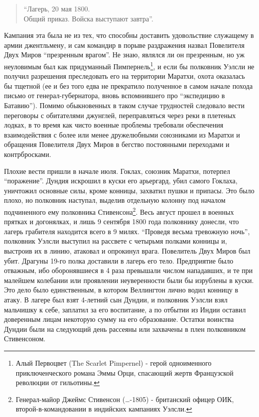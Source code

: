 \documentclass[
  oneside,
  12pt,
  titlepage]{book}
\begin{document}
\begin{quote}
``Лагерь, 20 мая 1800.\\
Общий приказ. Войска выступают завтра''.
\end{quote}

Кампания эта была не из тех, что способны доставить удовольствие служащему в армии джентльмену, и сам командир в порыве раздражения назвал Повелителя Двух Миров ``презренным врагом''. Не знаю, являлся ли он презренным, но уж неуловимым был как придуманный Пимпернель\footnote{Алый Первоцвет (The Scarlet Pimpernel) - герой одноименного приключенческого романа Эммы Орци, спасающий жертв Французской революции от гильотины.}, и если бы полковник Уэлсли не получил разрешения преследовать его на территории Маратхи, охота оказалась бы тщетной (ее и без того едва не прекратило полученное в самом начале похода письмо от генерал-губернатора, вновь вспомнившего про ``экспедицию в Батавию''). Помимо обыкновенных в таком случае трудностей следовало вести переговоры с обитателями джунглей, переправляться через реки в плетеных лодках, в то время как чисто военные проблемы требовали обеспечения взаимодействия с более или менее дружелюбными союзниками из Маратхи и обращения Повелителя Двух Миров в бегство постоянными переходами и контрбросками.

Плохие вести пришли в начале июля. Гоклах, союзник Маратхи, потерпел ``поражение''. Дундия искрошил в куски его арьергард, убил самого Гоклаха, уничтожил основные силы, кроме конницы, захватил пушки и припасы. Это было плохо, но полковник наступал, выделив отдельную колонну под началом подчиненного ему полковника Стивенсона\footnote{Генерал-майор Джеймс Стивенсон (\ldots-1805) - британский офицер ОИК, второй-в-командовании в индийских кампаниях Уэлсли.}. Весь август прошел в военных прятках и догонялках, и лишь 9 сентября 1800 года полковнику донесли, что лагерь грабителя находится всего в 9 милях. ``Проведя весьма тревожную ночь'', полковник Уэлсли выступил на рассвете с четырьмя полками конницы и, выстроив их в линию, атаковал и опрокинул врага. Повелитель Двух Миров был убит. Драгуны 19-го полка доставили в лагерь его тело. Предприятие было отважным, ибо оборонявшиеся в 4 раза превышали числом нападавших, и те при малейшем колебании или проявлении неуверенности были бы изрублены в куски. Это дело было единственным, в котором Веллингтон лично водил конницу в атаку. В лагере был взят 4-летний сын Дундии, и полковник Уэлсли взял мальчишку к себе, заплатил за его воспитание, а по отбытии из Индии оставил доверенным лицам некоторую сумму на его образование. Остатки воинства Дундии были на следующий день рассеяны или захвачены в плен полковником Стивенсоном.
\end{document}
